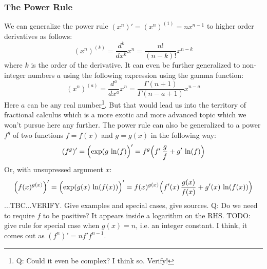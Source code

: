 \subsubsection{The Power Rule} 
We can generalize the power rule $(x^n)' = (x^n)^{(1)} = n x^{n-1}$ to higher order derivatives as follows:
\begin{equation}
 (x^n)^{(k)} = \frac{d^k}{d x^k} x^n = \frac{n!}{(n-k)!}x^{n-k}
\end{equation}
where $k$ is the order of the derivative. It can even be further generalized to non-integer numbers $a$ using the following expression using the gamma function:
\begin{equation}
 (x^n)^{(a)} = \frac{d^a}{d x^a} x^n = \frac{\Gamma(n+1)}{\Gamma(n-a+1)}x^{n-a}
\end{equation}
Here $a$ can be any real number\footnote{Q: Could it even be complex? I think so. Verify!}. But that would lead us into the territory of fractional calculus which is a more exotic and more advanced topic which we won't pursue here any further. The power rule can also be generalized to a power $f^g$ of two functions $f = f(x)$ and $g = g(x)$ in the following way:
\begin{equation}
 (f^g)' = \Bigl( \exp(g \, \ln(f) \Bigr) '
        = f^g \Bigl(f ' \, \frac{g}{f} + g' \, \ln(f) \Bigr)
\end{equation}
Or, with unsupressed argument $x$:
\begin{equation}
 \Bigl(f(x)^{g(x)}\Bigr)' 
 = \Bigl( \exp(g(x) \, \ln(f(x)) \Bigr) '
 = f(x)^{g(x)} \Bigl(f'(x) \, \frac{g(x)}{f(x)} + g'(x) \, \ln(f(x)) \Bigr)
\end{equation}
...TBC...VERIFY. Give examples and special cases, give sources. Q: Do we need to require $f$ to be positive? It appears inside a logarithm on the RHS. TODO: give rule for special case when $g(x) = n$, i.e. an integer constant. I think, it comes out as $(f^n)' = n f' f^{n-1}$.

%
%


